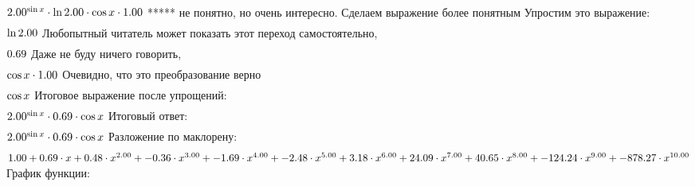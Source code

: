 \begin{gather}
\end{gather}
\begin{math}
2.00 ^ {\sin x }\cdot \ln 2.00 \cdot \cos x \cdot 1.00 \\
\end{math}
***** не понятно, но очень интересно. Сделаем выражение более понятным
Упростим это выражение: 
\begin{gather}
\end{gather}
\begin{math}
\ln 2.00 \\
\end{math}
Любопытный читатель может показать этот переход самостоятельно, 
\begin{gather}
\end{gather}
\begin{math}
0.69 \\
\end{math}
Даже не буду ничего говорить, 
\begin{gather}
\end{gather}
\begin{math}
\cos x \cdot 1.00 \\
\end{math}
Очевидно, что это преобразование верно
\begin{gather}
\end{gather}
\begin{math}
\cos x \\
\end{math}
Итоговое выражение после упрощений:
\begin{gather}
\end{gather}
\begin{math}
2.00 ^ {\sin x }\cdot 0.69 \cdot \cos x \\
\end{math}
Итоговый ответ: 
\begin{gather}
\end{gather}
\begin{math}
2.00 ^ {\sin x }\cdot 0.69 \cdot \cos x \\
\end{math}
Разложение по маклорену: 
\begin{gather}
\end{gather}
\begin{math}
1.00 + 0.69 \cdot x + 0.48 \cdot x ^ {2.00 }+ -0.36 \cdot x ^ {3.00 }+ -1.69 \cdot x ^ {4.00 }+ -2.48 \cdot x ^ {5.00 }+ 3.18 \cdot x ^ {6.00 }+ 24.09 \cdot x ^ {7.00 }+ 40.65 \cdot x ^ {8.00 }+ -124.24 \cdot x ^ {9.00 }+ -878.27 \cdot x ^ {10.00 }\\
\end{math}
График функции:

